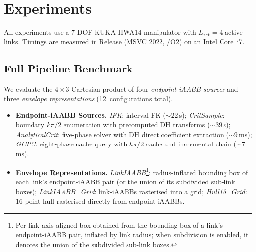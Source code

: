 \documentclass[journal]{IEEEtran}
\newcommand{\LinkIAABBDef}{Per-link axis-aligned box obtained from the bounding box of a link's endpoint-iAABB pair, inflated by link radius; when subdivision is enabled, it denotes the union of the subdivided sub-link boxes.}
\begin{document}
\section{Experiments}\label{sec:experiments}


All experiments use a 7-DOF KUKA IIWA14 manipulator with
$L_\text{act}{=}4$ active links.
Timings are measured in Release (MSVC 2022, /O2) on an Intel Core~i7.

\subsection{Full Pipeline Benchmark}\label{sec:exp_pipeline}

We evaluate the $4{\times}3$ Cartesian product of four
\emph{endpoint-iAABB sources} and three \emph{envelope representations}
(12~configurations total).

\begin{itemize}
  \item \textbf{Endpoint-iAABB Sources.}
    \emph{IFK}: interval FK (${\sim}22$\,\textmu s);
    \emph{CritSample}: boundary $k\pi/2$ enumeration with
    precomputed DH transforms (${\sim}39$\,\textmu s);
    \emph{AnalyticalCrit}: five-phase solver with DH direct
    coefficient extraction (${\sim}9$\,ms);
    \emph{GCPC}: eight-phase cache query with $k\pi/2$ cache
    and incremental chain (${\sim}7$\,ms).
  \item \textbf{Envelope Representations.}
    \emph{LinkIAABB}\footnote{\LinkIAABBDef}: radius-inflated bounding box of each link's
    endpoint-iAABB pair (or the union of its subdivided sub-link boxes);
    \emph{LinkIAABB\_Grid}: link-iAABBs rasterised into a grid;
    \emph{Hull16\_Grid}: 16-point hull rasterised directly from
    endpoint-iAABBs.
\end{itemize}
\end{document}
